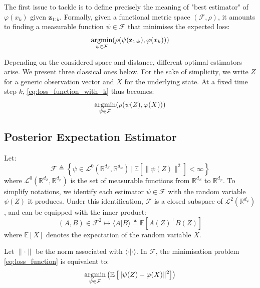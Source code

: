 The first issue to tackle is to define precisely the meaning of "best estimator" of $\varphi(x_k)$ given $\mathbf{z}_{1:k}$. Formally, given a functional metric space $(\mathcal{F},\rho)$, it amounts to finding a measurable function $\psi\in\mathcal{F}$ that minimises the expected loss:
\begin{equation}
	\underset{\psi\in\mathcal{F}}{\textup{argmin}}(\rho(\psi(\mathbf{z}_{1:k}),\varphi(x_k)))\label{eq:loss_function_with_k}
\end{equation}

Depending on the considered space and distance, different optimal estimators arise. We present three classical ones below. For the sake of simplicity, we write $Z$ for a generic observation vector and $X$ for the underlying state. At a fixed time step $k$, \eqref{eq:loss_function_with_k} thus becomes:
\begin{equation}
	\underset{\psi\in\mathcal{F}}{\textup{argmin}}(\rho(\psi(Z),\varphi(X)))\label{eq:loss_function}
\end{equation}

\subsection{Posterior Expectation Estimator}

Let:
\begin{equation}
	\mathcal{F}\triangleq\left\{\psi\in\mathcal{L}^0\left(\mathbb{R}^{d_Z},\mathbb{R}^{d_{\varphi}}\right)\:|\:\mathbb{E}\left[\|\psi(Z)\|^2\right]<\infty\right\}
\end{equation}
where $\mathcal{L}^0(\mathbb{R}^{d_Z},\mathbb{R}^{d_{\varphi}})$ is the set of measurable functions from $\mathbb{R}^{d_Z}$ to $\mathbb{R}^{d_{\varphi}}$. To simplify notations, we identify each estimator $\psi\in\mathcal{F}$ with the random variable $\psi(Z)$ it produces. Under this identification, $\mathcal{F}$ is a closed subspace of $\mathcal{L}^2\left(\mathbb{R}^{d_{\varphi}}\right)$, and can be equipped with the inner product:
\begin{equation}
	(A,B)\in\mathcal{F}^2\mapsto\langle A|B\rangle\triangleq\mathbb{E}\left[A(Z)^\top B(Z)\right]
\end{equation}
where $\mathbb{E}[X]$ denotes the expectation of the random variable $X$.

Let $\|\cdot\|$ be the norm associated with $\langle\cdot|\cdot\rangle$. In $\mathcal{F}$, the minimisation problem \eqref{eq:loss_function} is equivalent to:
\begin{equation}
	\underset{\psi\in\mathcal{F}}{\textup{argmin}}\left(\mathbb{E}\left[\|\psi(Z)-\varphi(X)\|^2\right]\right)\label{eq:MMSE_problem}
\end{equation}

